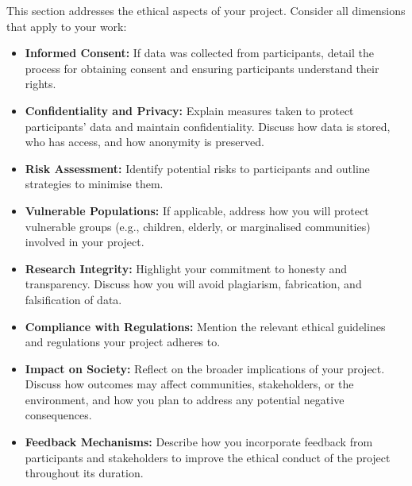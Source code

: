 This section addresses the ethical aspects of your project. Consider all 
dimensions that apply to your work:

\begin{itemize}
    \item \textbf{Informed Consent:} If data was collected from participants, 
    detail the process for obtaining consent and ensuring participants understand 
    their rights.

    \item \textbf{Confidentiality and Privacy:} Explain measures taken to 
    protect participants' data and maintain confidentiality. Discuss how data 
    is stored, who has access, and how anonymity is preserved.

    \item \textbf{Risk Assessment:} Identify potential risks to participants 
    and outline strategies to minimise them.

    \item \textbf{Vulnerable Populations:} If applicable, address how you will 
    protect vulnerable groups (e.g., children, elderly, or marginalised 
    communities) involved in your project.

    \item \textbf{Research Integrity:} Highlight your commitment to honesty 
    and transparency. Discuss how you will avoid plagiarism, fabrication, 
    and falsification of data.

    \item \textbf{Compliance with Regulations:} Mention the relevant ethical 
    guidelines and regulations your project adheres to.

    \item \textbf{Impact on Society:} Reflect on the broader implications of 
    your project. Discuss how outcomes may affect communities, stakeholders, 
    or the environment, and how you plan to address any potential negative 
    consequences.

    \item \textbf{Feedback Mechanisms:} Describe how you incorporate feedback 
    from participants and stakeholders to improve the ethical conduct of the 
    project throughout its duration.
\end{itemize}

